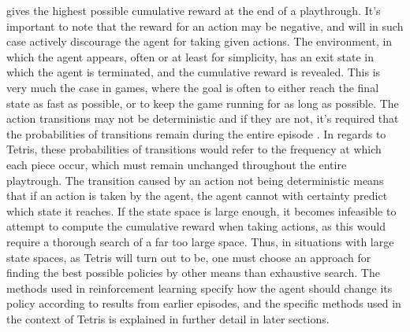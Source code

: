 gives the highest possible cumulative reward at the end of a playthrough. 
It's important to note that the reward 
for an action may be negative, and will in such case actively discourage 
the agent for taking given actions.
The environment, in which the agent appears, often 
or at least for simplicity, has an exit state
in which the agent is terminated, and the cumulative reward 
is revealed. This is very much the case in games, where the goal 
is often to either reach the final state as fast as possible,
or to keep the game running for as long as possible.
The action transitions may 
not be deterministic and if they are not,
it's required that the probabilities of transitions
remain during the entire episode \citep{Carr}. In regards to Tetris, these probabilities of
transitions would refer to the frequency at which each piece occur, which must remain
unchanged throughout the entire playtrough.
The transition caused by an action not being deterministic
means that if an action is taken by the agent, the agent cannot 
with certainty predict which state it reaches.
If the state space 
is large enough, it becomes infeasible to attempt to compute 
the cumulative reward when taking actions, as this would require
a thorough search of a far too large space. Thus, in situations 
with large state spaces, as Tetris will turn out to be, one must choose 
an approach for finding the best possible policies by other
means than exhaustive search. 
The methods used in reinforcement learning 
specify how the agent should change its policy according to 
results from earlier episodes, and the specific methods used in
the context of Tetris is explained in further detail in later sections.













